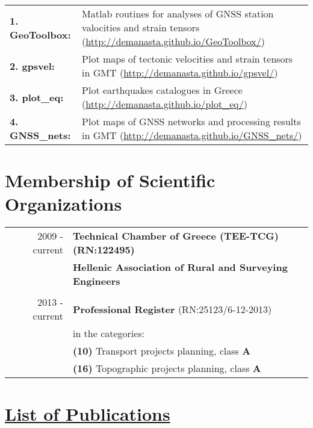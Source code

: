 \documentclass[a4paper]{Classes/cv_prof_en} %
\begin{document}
\begin{tabular}{l p{13cm}}
\textbf{1. GeoToolbox:} & Matlab routines for analyses of GNSS station valocities and strain tensors (\href{http://demanasta.github.io/GeoToolbox/}{http://demanasta.github.io/GeoToolbox/}) \\
\textbf{2. gpsvel:} & Plot maps of tectonic velocities and strain tensors in GMT (\href{http://demanasta.github.io/gpsvel/}{http://demanasta.github.io/gpsvel/}) \\
\textbf{3. plot\_eq:} & Plot earthquakes catalogues in Greece (\href{http://demanasta.github.io/plot\_eq/}{http://demanasta.github.io/plot\_eq/}) \\
\textbf{4. GNSS\_nets:} & Plot maps of GNSS networks and processing results in GMT (\href{http://demanasta.github.io/GNSS\_nets/}{http://demanasta.github.io/GNSS\_nets/}) \\

\end{tabular}

\section{Membership of Scientific Organizations}
\begin{tabular}{r|p{11cm}}
2009 - current  & \textbf{Technical Chamber of Greece (TEE-TCG) (RN:122495)}\\
		& \textbf{Hellenic Association of Rural and Surveying Engineers}\\
				\multicolumn{2}{c}{}\\
2013 - current & \textbf{Professional Register} (RN:25123/6-12-2013)\\
    & in the categories:\\
    & \textbf{(10)} Transport projects planning, class \textbf{A}\\
    & \textbf{(16)} Topographic projects planning, class \textbf{A}\\
\end{tabular}

\newpage
{\specialsection \section*{\underline{List of Publications}}}

\end{document}
